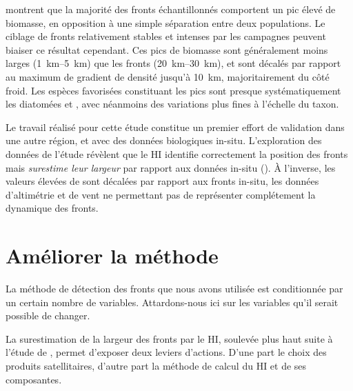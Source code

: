 \Textcite{mangolte_2023} montrent que la majorité des fronts échantillonnés comportent un pic élevé de biomasse, en opposition à une simple séparation entre deux populations.
Le ciblage de fronts relativement stables et intenses par les campagnes peuvent biaiser ce résultat cependant.
Ces pics de biomasse sont généralement moins larges (\qtyrange{1}{5}{\km}) que les fronts (\qtyrange{20}{30}{\km}), et sont décalés par rapport au maximum de gradient de densité jusqu'à \qty{10}{\km}, majoritairement du côté froid.
Les espèces favorisées constituant les pics sont presque systématiquement les diatomées et , avec néanmoins des variations plus fines à l'échelle du taxon.

Le travail réalisé pour cette étude  constitue un premier effort de validation dans une autre région, et avec des données biologiques in-situ.
L'exploration des données de l'étude révèlent que le HI identifie correctement la position des fronts mais \emph{surestime leur largeur} par rapport aux données in-situ (\nref{}).
À l'inverse, les valeurs élevées de  sont décalées par rapport aux fronts in-situ, les données d'altimétrie et de vent ne permettant pas de représenter complétement la dynamique des fronts.

\begin{figure}
  \centering
  \label{fig:comp-hi-fsle}
\end{figure}

\section{Améliorer la méthode}

La méthode de détection des fronts que nous avons utilisée  est conditionnée par un certain nombre de variables.
Attardons-nous ici sur les variables qu'il serait possible de changer.

La surestimation de la largeur des fronts par le HI, soulevée plus haut suite à l'étude de \textcite{mangolte_2023}, permet d'exposer deux leviers d'actions. D'une part le choix des produits satellitaires, d'autre part la méthode de calcul du HI et de ses composantes.

